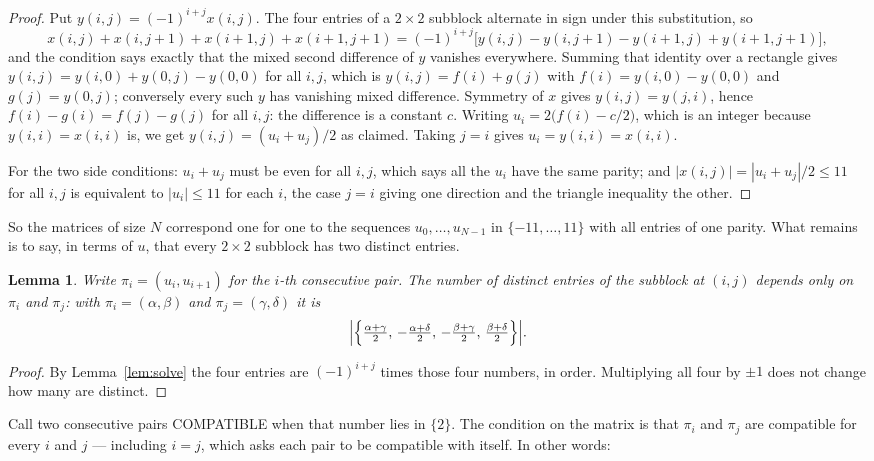 \documentclass[11pt,a4paper]{article}
\theoremstyle{plain}
\newtheorem{lemma}[theorem]{Lemma}
\theoremstyle{definition}
\begin{document}
\begin{proof}
Put $y(i,j)=(-1)^{i+j}x(i,j)$. The four entries of a $2\times2$ subblock alternate in sign
under this substitution, so
\[
x(i,j)+x(i,j{+}1)+x(i{+}1,j)+x(i{+}1,j{+}1)
=(-1)^{i+j}\bigl[y(i,j)-y(i,j{+}1)-y(i{+}1,j)+y(i{+}1,j{+}1)\bigr],
\]
and the condition says exactly that the mixed second difference of $y$ vanishes everywhere.
Summing that identity over a rectangle gives
$y(i,j)=y(i,0)+y(0,j)-y(0,0)$ for all $i,j$, which is $y(i,j)=f(i)+g(j)$ with
$f(i)=y(i,0)-y(0,0)$ and $g(j)=y(0,j)$; conversely every such $y$ has vanishing mixed
difference. Symmetry of $x$ gives $y(i,j)=y(j,i)$, hence $f(i)-g(i)=f(j)-g(j)$ for all $i,j$:
the difference is a constant $c$. Writing $u_i=2\bigl(f(i)-c/2\bigr)$, which is an integer
because $y(i,i)=x(i,i)$ is, we get $y(i,j)=(u_i+u_j)/2$ as claimed. Taking $j=i$ gives
$u_i=y(i,i)=x(i,i)$.

For the two side conditions: $u_i+u_j$ must be even for all $i,j$, which says all the $u_i$ have
the same parity; and $|x(i,j)|=|u_i+u_j|/2\le11$ for all $i,j$ is equivalent to $|u_i|\le11$
for each $i$, the case $j=i$ giving one direction and the triangle inequality the other.
\end{proof}

So the matrices of size $N$ correspond one for one to the sequences $u_0,\dots,u_{N-1}$ in
$\{-11,\dots,11\}$ with all entries of one parity. What remains is to say, in terms of $u$,
that every $2\times2$ subblock has two distinct entries.

\begin{lemma}\label{lem:block}
Write $\pi_i=(u_i,u_{i+1})$ for the $i$-th consecutive pair. The number of distinct entries of
the subblock at $(i,j)$ depends only on $\pi_i$ and $\pi_j$: with $\pi_i=(\alpha,\beta)$ and
$\pi_j=(\gamma,\delta)$ it is
\[
\Bigl|\Bigl\{\tfrac{\alpha+\gamma}{2},\,-\tfrac{\alpha+\delta}{2},\,
-\tfrac{\beta+\gamma}{2},\,\tfrac{\beta+\delta}{2}\Bigr\}\Bigr| .
\]
\end{lemma}

\begin{proof}
By Lemma~\ref{lem:solve} the four entries are $(-1)^{i+j}$ times those four numbers, in
order. Multiplying all four by $\pm1$ does not change how many are distinct.
\end{proof}

Call two consecutive pairs COMPATIBLE when that number lies in $\{2\}$. The condition on the
matrix is that $\pi_i$ and $\pi_j$ are compatible for every $i$ and $j$ --- including $i=j$,
which asks each pair to be compatible with itself. In other words:
\end{document}
